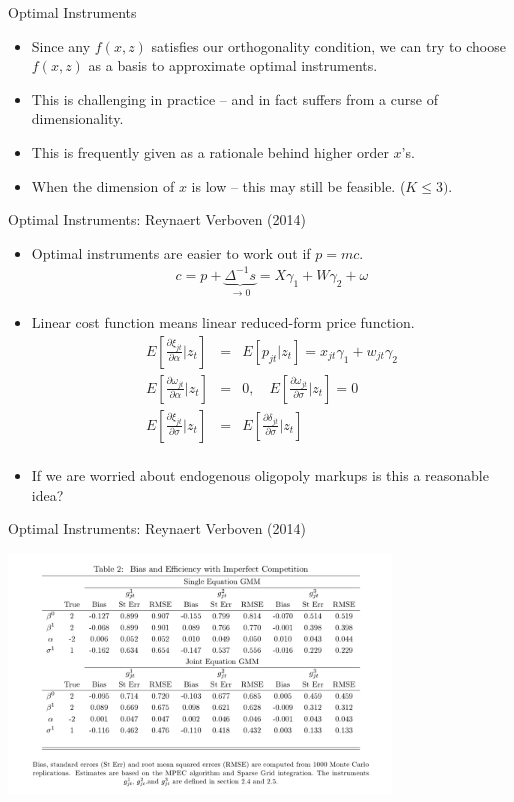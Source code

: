 \documentclass[xcolor=pdftex,dvipsnames,table,mathserif,aspectratio=169]{beamer}
\begin{document}
\begin{frame}{Optimal Instruments}
\begin{itemize}
\item Since any $f(x,z)$ satisfies our orthogonality condition, we can try to choose $f(x,z)$ as a \alert{basis} to approximate optimal instruments.
\item This is challenging in practice -- and in fact suffers from a curse of dimensionality.
\item This is frequently given as a rationale behind higher order $x$'s.
\item When the dimension of $x$ is low -- this may still be feasible. ($K \leq 3)$.
\end{itemize}
\end{frame}

\begin{frame}{Optimal Instruments: Reynaert Verboven (2014)}
\begin{itemize}
\footnotesize
\item Optimal instruments are easier to work out if $p = mc$.
\begin{eqnarray*}
c = p  + \underbrace{\Delta^{-1} s}_{\rightarrow 0}  = X \gamma_1 + W \gamma_2 + \omega
\end{eqnarray*}
\item Linear cost function means linear reduced-form price function.
\begin{eqnarray*}
E\left[ \frac{\partial \xi_{jt} }{\partial \alpha} | z_t \right] &=& E[p_{jt} | z_t] = x_{jt} \gamma_1 + w_{jt} \gamma_2\\
E\left[ \frac{\partial \omega_{jt} }{\partial \alpha} | z_t \right] &=& 0 , \quad E\left[ \frac{\partial \omega_{jt} }{\partial \sigma} | z_t \right] = 0\\
E\left[ \frac{\partial \xi_{jt} }{\partial \sigma} | z_t \right] &=&E\left[ \frac{\partial \delta_{jt} }{\partial \sigma} | z_t \right]\\
\end{eqnarray*}
\item If we are worried about endogenous oligopoly markups is this a reasonable idea?
\end{itemize}
\end{frame}

\begin{frame}{Optimal Instruments: Reynaert Verboven (2014)}
\begin{center}
\includegraphics[width=4in]{resources/verboven.png}
\end{center}
\end{frame}
\end{document}
